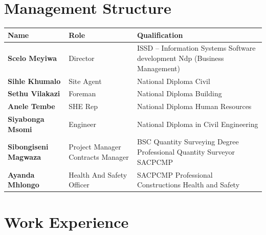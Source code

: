 \documentclass[a4paper,11pt]{article}
\begin{document}
\vspace{0.6cm}

\section{Management Structure}

{\color{awenDarkGrey}
\renewcommand{\arraystretch}{1.45}
\begin{tabularx}{\textwidth}{@{} L{4.2cm} L{3.8cm} X @{}}
  \toprule
  \textcolor{awenWhite}{\bfseries Name} & 
  \textcolor{awenWhite}{\bfseries Role} & 
  \textcolor{awenWhite}{\bfseries Qualification} \\
  \midrule
  \textbf{Scelo Meyiwa}      & Director & ISSD – Information Systems Software development \newline Ndp (Business Management) \\
  \textbf{Sihle Khumalo}     & Site Agent & National Diploma Civil \\
  \textbf{Sethu Vilakazi}    & Foreman & National Diploma Building \\
  \textbf{Anele Tembe}       & SHE Rep & National Diploma Human Resources \\
  \textbf{Siyabonga Msomi}   & Engineer & National Diploma in Civil Engineering \\
  \textbf{Sibongiseni Magwaza} & Project Manager \newline Contracts Manager & BSC Quantity Surveying Degree \newline Professional Quantity Surveyor \newline SACPCMP \\
  \textbf{Ayanda Mhlongo}    & Health And Safety Officer & SACPCMP \newline Professional Constructions Health and Safety \\
  \bottomrule
\end{tabularx}
}

\newpage

\section{Work Experience}
\end{document}
